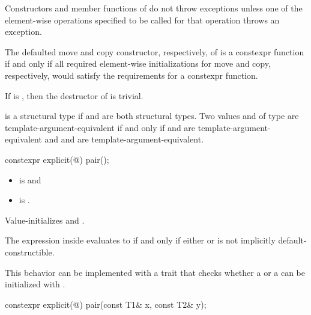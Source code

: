 \documentclass{wg21}
\begin{document}
\pnum
Constructors and member functions of  do not throw exceptions unless one of
the element-wise operations specified to be called for that operation
throws an exception.

\pnum
The defaulted move and copy constructor, respectively, of 
is a constexpr function if and only if all required element-wise
initializations for move and copy, respectively, would satisfy the
requirements for a constexpr function.

\pnum
If 
is , then the destructor of  is trivial.

\pnum
{} is a structural type
if  and  are both structural types.
Two values  and  of type 
are template-argument-equivalent if and only if
 and  are template-argument-equivalent and
 and  are template-argument-equivalent.

%
\begin{itemdecl}
    constexpr explicit(@\seebelow@) pair();
\end{itemdecl}

\begin{itemdescr}
    \pnum
    \constraints
    \begin{itemize}
        \item {} is  and
        \item {} is .
    \end{itemize}

    \pnum
    \effects
    Value-initializes  and .

    \pnum
    \remarks
    The expression inside  evaluates to 
    if and only if either  or
     is not implicitly default-constructible.
    \begin{note}
        This behavior can be implemented with a trait that checks
        whether a  or a 
        can be initialized with \tcode{\{\}}.
    \end{note}
\end{itemdescr}

%
\begin{itemdecl}
    constexpr explicit(@\seebelow@) pair(const T1& x, const T2& y);
\end{itemdecl}
\end{document}
